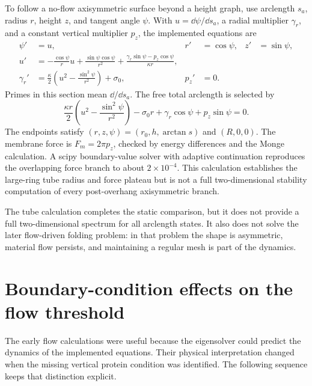To follow a no-flow axisymmetric surface beyond a height graph, use arclength $s_a$, radius $r$, height $z$, and tangent angle $\psi$. With $u=\dd\psi/\dd s_a$, a radial multiplier $\gamma_r$, and a constant vertical multiplier $p_z$, the implemented equations are
\begin{align}
\psi'&=u,&r'&=\cos\psi,&z'&=\sin\psi,\\
u'&=-\frac{\cos\psi}{r}u+\frac{\sin\psi\cos\psi}{r^2}
+\frac{\gamma_r\sin\psi-p_z\cos\psi}{\kappa r},\\
\gamma_r'&=\frac{\kappa}{2}\left(u^2-\frac{\sin^2\psi}{r^2}\right)+\sigma_0,&p_z'&=0.
\end{align}
Primes in this section mean $\dd/\dd s_a$. The free total arclength is selected by
\begin{equation}
\frac{\kappa r}{2}\left(u^2-\frac{\sin^2\psi}{r^2}\right)-\sigma_0r+\gamma_r\cos\psi+p_z\sin\psi=0.
\end{equation}
The endpoints satisfy $(r,z,\psi)=(r_0,h,\arctan s)$ and $(R,0,0)$. The membrane force is $F_m=2\pi p_z$, checked by energy differences and the Monge calculation. A scipy boundary-value solver with adaptive continuation reproduces the overlapping force branch to about $2\times10^{-4}$. This calculation establishes the large-ring tube radius and force plateau but is not a full two-dimensional stability computation of every post-overhang axisymmetric branch.




The tube calculation completes the static comparison, but it does not provide a full two-dimensional spectrum for all arclength states. It also does not solve the later flow-driven folding problem: in that problem the shape is asymmetric, material flow persists, and maintaining a regular mesh is part of the dynamics.


\section{Boundary-condition effects on the flow threshold}\label{sec:flowhistory}
The early flow calculations were useful because the eigensolver could predict the dynamics of the implemented equations. Their physical interpretation changed when the missing vertical protein condition was identified. The following sequence keeps that distinction explicit.


